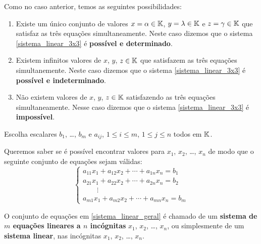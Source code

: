\documentclass{beamer}
\begin{document}
    \begin{frame}
        Como no caso anterior, temos as seguintes possibilidades:
        \begin{enumerate}[label={\roman*})]
            \item Existe um único conjunto de valores $x = \alpha \in \mathbb{K}$, $y = \lambda \in \mathbb{K}$ e $z = \gamma \in \mathbb{K}$ que satisfaz as três equações simultaneamente. Neste caso dizemos que o sistema \eqref{sistema_linear_3x3} é \textbf{possível e determinado}.

            \item Existem infinitos valores de $x$, $y$, $z \in \mathbb{K}$ que satisfazem as três equações simultanemente. Neste caso dizemos que o sistema \eqref{sistema_linear_3x3} é \textbf{possível e indeterminado}.

            \item Não existem valores de $x$, $y$, $z \in \mathbb{K}$ satisfazendo as três equações simultaneamente. Nesse caso dizemos que o sistema \eqref{sistema_linear_3x3} é \textbf{impossível}.
        \end{enumerate}
    \end{frame}

    \begin{frame}

        Escolha escalares $b_1$, \dots, $b_m$ e $a_{ij}$, $1 \le i \le m$, $1 \le j \le n$ todos em $\mathbb{K}$.

        \vspace{.3cm}

        Queremos saber se é possível encontrar valores para  $x_1$, $x_2$, \dots, $x_n$ de modo que o seguinte conjunto de equações sejam válidas: 
        \begin{equation}\label{sistema_linear_geral}
	    \begin{cases}
                a_{11}x_1 + a_{12}x_2 + \cdots + a_{1n}x_n = b_1\\
                a_{21}x_1 + a_{22}x_2 + \cdots + a_{2n}x_n = b_2\\
                \qquad \vdots\\
                a_{m1}x_1 + a_{m2}x_2 + \cdots + a_{mn}x_n = b_m
            \end{cases}
        \end{equation}
        
        O conjunto de equações em \eqref{sistema_linear_geral} é chamado de um \textbf{sistema de $m$ equa\c{c}\~oes lineares a $n$ inc\'ognitas} $x_1$, $x_2$, \dots, $x_n$, ou simplesmente de um \textbf{sistema linear}, nas incógnitas $x_1$, $x_2$, \dots, $x_n$.
    \end{frame}
\end{document}
